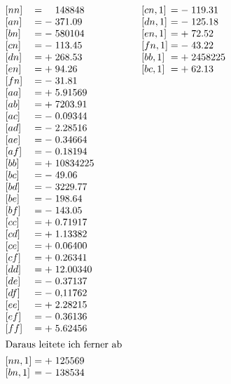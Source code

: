 {\fontsize{9}{11}\selectfont
\[
\begin{array}{@{}l@{\qquad}l@{\qquad}l@{}}
\begin{array}[t]{@{}l@{\;}c@{\;}c@{\;}l@{}}
{[nn]}&=&&148848\\
{[an]}&=&-&371.09\\
{[bn]}&=&-&580104\\
{[cn]}&=&-&113.45\\
{[dn]}&=&+&268.53\\
{[en]}&=&+&94.26\\
{[fn]}&=&-&31.81\\
{[aa]}&=&+&5.91569\\
{[ab]}&=&+&7203.91\\
{[ac]}&=&-&0.09344\\
{[ad]}&=&-&2.28516\\
{[ae]}&=&-&0.34664\\
{[af]}&=&-&0.18194\\
{[bb]}&=&+&10834225\\
{[bc]}&=&-&49.06\\
{[bd]}&=&-&3229.77\\
{[be]}&=&-&198.64\\
{[bf]}&=&-&143.05\\
{[cc]}&=&+&0.71917\\
{[cd]}&=&+&1.13382\\
{[ce]}&=&+&0.06400\\
{[cf]}&=&+&0.26341\\
{[dd]}&=&+&12.00340\\
{[de]}&=&-&0.37137\\
{[df]}&=&-&0{,}11762\\
{[ee]}&=&+&2.28215\\
{[ef]}&=&-&0.36136\\
{[ff]}&=&+&5.62456\\[4.5pt]
\multicolumn{4}{@{}c@{}}{\text{Daraus leitete ich ferner ab}}\\[4.5pt]
{[nn,1]}&=&+&125569\\
{[bn,1]}&=&-&138534
\end{array}&
\begin{array}[t]{@{}l@{\;}c@{\;}c@{\;}l@{}}
{[cn,1]}&=&-&119.31\\
{[dn,1]}&=&-&125.18\\
{[en,1]}&=&+&72.52\\
{[fn,1]}&=&-&43.22\\
{[bb,1]}&=&+&2458225\\
{[bc,1]}&=&+&62.13\\

\end{array}
\end{array}\]}
